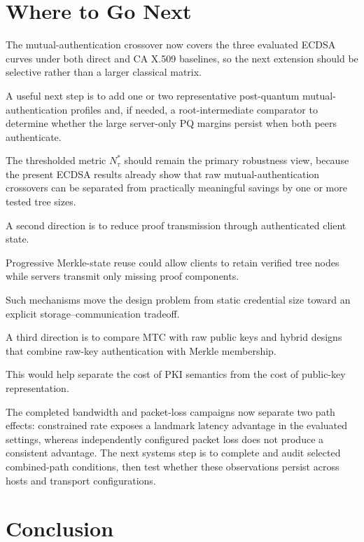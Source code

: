 \documentclass[journal]{IEEEtran}
\begin{document}
\section{Where to Go Next}



The mutual-authentication crossover now covers the three evaluated ECDSA curves under both direct and CA X.509 baselines, so the next extension should be selective rather than a larger classical matrix.

A useful next step is to add one or two representative post-quantum mutual-authentication profiles and, if needed, a root-intermediate comparator to determine whether the large server-only PQ margins persist when both peers authenticate.

The thresholded metric $N^*_{\tau}$ should remain the primary robustness view, because the present ECDSA results already show that raw mutual-authentication crossovers can be separated from practically meaningful savings by one or more tested tree sizes.

A second direction is to reduce proof transmission through authenticated client state.

Progressive Merkle-state reuse could allow clients to retain verified tree nodes while servers transmit only missing proof components.

Such mechanisms move the design problem from static credential size toward an explicit storage--communication tradeoff.



A third direction is to compare MTC with raw public keys and hybrid designs that combine raw-key authentication with Merkle membership.

This would help separate the cost of PKI semantics from the cost of public-key representation.



The completed bandwidth and packet-loss campaigns now separate two path effects: constrained rate exposes a landmark latency advantage in the evaluated settings, whereas independently configured packet loss does not produce a consistent advantage. The next systems step is to complete and audit selected combined-path conditions, then test whether these observations persist across hosts and transport configurations.



\section{Conclusion}
\end{document}
